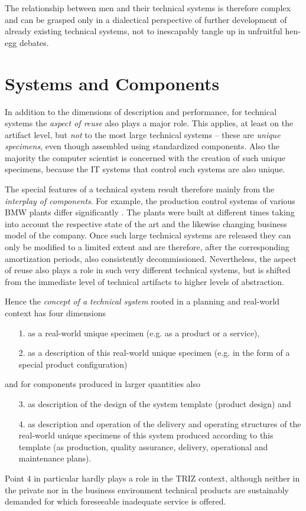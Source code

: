\documentclass{llncs}
\begin{document}
The relationship between men and their technical systems is therefore complex
and can be grasped only in a dialectical perspective of further development of
already existing technical systems, not to inescapably tangle up in unfruitful
hen-egg debates. 

\section{Systems and Components}

In addition to the dimensions of description and performance, for technical
systems the \emph{aspect of reuse} also plays a major role. This applies, at
least on the artifact level, but \emph{not} to the most large technical
systems -- these are \emph{unique specimens}, even though assembled using
standardized components. Also the majority the computer scientist is concerned
with the creation of such unique specimens, because the IT systems that
control such systems are also unique. 

The special features of a technical system result therefore mainly from the
\emph{interplay of components}. For example, the production control systems of
various BMW plants differ significantly \cite{Kropik2009}. The plants were
built at different times taking into account the respective state of the art
and the likewise changing business model of the company. Once such large
technical systems are released they can only be modified to a limited extent
and are therefore, after the corresponding amortization periods, also
consistently decommissioned. Nevertheless, the aspect of reuse also plays a
role in such very different technical systems, but is shifted from the
immediate level of technical artifacts to higher levels of abstraction.

Hence the \emph{concept of a technical system} rooted in a planning and
real-world context has four dimensions
\begin{itemize}
\item [1.] as a real-world unique specimen (e.g. as a product or a service),
\item [2.] as a description of this real-world unique specimen (e.g. in the
  form of a special product configuration)
\end{itemize}
and for components produced in larger quantities also
\begin{itemize}
\item [3.] as description of the design of the system template (product
  design) and
\item [4.] as description and operation of the delivery and operating
  structures of the real-world unique specimens of this system produced
  according to this template (as production, quality assurance, delivery,
  operational and maintenance plans).
\end{itemize}
Point 4 in particular hardly plays a role in the TRIZ context, although
neither in the private nor in the business environment technical products are
sustainably demanded for which foreseeable inadequate service is offered.
\end{document}
